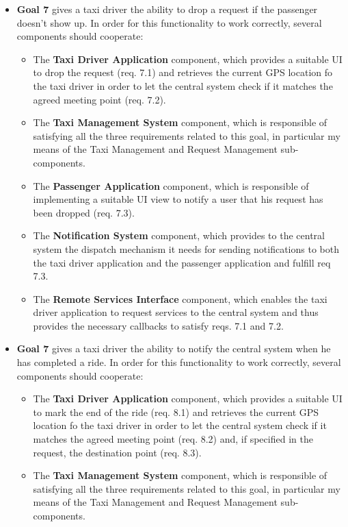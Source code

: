 \begin{itemize}
\begin{itemize}
	\end{itemize}
	\item \textbf{Goal 7} gives a taxi driver the ability to drop a request if the passenger doesn't show up. In order for this functionality to work correctly, several components should cooperate:
	\begin{itemize}
	\item The \textbf{Taxi Driver Application} component, which provides a suitable UI to drop the request (req. 7.1) and retrieves the current GPS location fo the taxi driver in order to let the central system check if it matches the agreed meeting point (req. 7.2).
	\item The \textbf{Taxi Management System} component, which is responsible of satisfying all the three requirements related to this goal, in particular my means of the Taxi Management and Request Management sub-components.
	\item The \textbf{Passenger Application} component, which is responsible of implementing a suitable UI view to notify a user that his request has been dropped (req. 7.3).
	\item The \textbf{Notification System} component, which provides to the central system the dispatch mechanism it needs for sending notifications to both the taxi driver application and the passenger application and fulfill req 7.3.
	\item The \textbf{Remote Services Interface} component, which enables the taxi driver application to request services to the central system and thus provides the necessary callbacks to satisfy reqs. 7.1 and 7.2.
	\end{itemize}
	\item \textbf{Goal 7} gives a taxi driver the ability to notify the central system when he has completed a ride. In order for this functionality to work correctly, several components should cooperate:
	\begin{itemize}
	\item The \textbf{Taxi Driver Application} component, which provides a suitable UI to mark the end of the ride (req. 8.1) and retrieves the current GPS location fo the taxi driver in order to let the central system check if it matches the agreed meeting point (req. 8.2) and, if specified in the request, the destination point (req. 8.3).
	\item The \textbf{Taxi Management System} component, which is responsible of satisfying all the three requirements related to this goal, in particular my means of the Taxi Management and Request Management sub-components.

\end{itemize}
\end{itemize}
